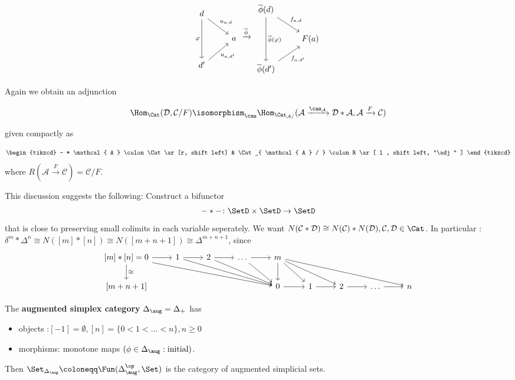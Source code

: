 \[
\begin{tikzcd}
	d
	\ar[rd, "u_{ a ,d } "]
	\ar[dd, "\varphi"']
	\\
	&
	a
	\\
	d'
	\ar[ru, "u_{ a , d' }"' ]
\end{tikzcd}
\xrightarrow{\overline{\phi}}
\begin{tikzcd}
	\overline{\phi} ( d )
	\ar[rd, "f_{ a ,d } "]
	\ar[dd, "\overline{ \phi } ( \varphi )"]
	\\
	&
	F ( a )
	\\
	\overline{\phi} ( d' )
	\ar[ru, "f_{ a , d' }"' ]
\end{tikzcd}
\] 

Again we obtain an adjunction

\[
	\Hom_{ \Cat } ( \mathcal{ D } , \mathcal{ C } / F )
	\isomorphism_{ \can }
	\Hom_{ \Cat_{ \mathcal{ A } / } } ( \mathcal{ A } \xrightarrow{ \can_{ \mathcal{ A } } } \mathcal{ D } * \mathcal{ A } , \mathcal{ A } \xrightarrow{ F } \mathcal{ C } )
\]

given compactly as 

\[
\begin{tikzcd}
	- * \mathcal{ A } \colon \Cat
	\ar[r, shift left]
	&
	\Cat_{ \mathcal{ A } / } \colon R 
	\ar[ l , shift left, "\adj" ]
\end{tikzcd}
\]
where $ R ( \mathcal{ A } \xrightarrow{ F } \mathcal{ C } ) = \mathcal{ C } / F $. 

This discussion suggests the following:
Construct a bifunctor 
\[
	- * - \colon \SetD \times \SetD \to \SetD	
\]
that is close to preserving small colimits in each variable seperately.
We want $ N ( \mathcal{ C } * \mathcal{ D } ) \cong N ( \mathcal{ C } ) * N ( \mathcal{ D } ), \mathcal{ C } , \mathcal{ D } \in \Cat $.
In particular : $ \delta^m * \Delta^n \cong N ( [ m ] * [ n ] ) \cong N ( [ m + n + 1 ] ) \cong \Delta^{ m + n + 1 } $, since
\[
\begin{tikzcd}
	\left[ m \right] * [ n ] = 0
	\ar[d, " \cong"]
	\ar[r]
	\ar[rrrrd]
	&
	1
	\ar[r]
	\ar[rrrd]
	&
	2
	\ar[r]
	\ar[rrd]
	&
	\dotsc
	\ar[r]
	\ar[rd]
	&
	m
	\ar[d]
	\ar[rd]
	\ar[rrd]
	\ar[rrrrd]
	\\
	\left[ m + n + 1 \right]
	&&&&
	0
	\ar[r]
	&
	1
	\ar[r]
	&
	2
	\ar[r]
	&
	\dotsc 
	\ar[r]
	&
	n
\end{tikzcd}
\]

\begin{defi}
	The \textbf{augmented simplex category} $ \Delta_{ \aug } = \Delta_+ $ has 
	\begin{itemize}
		\item 
		objects :$ [ - 1 ] = \emptyset , [ n ] = \{ 0 < 1 < \dotsc < n \}, n \geq 0 $
		
		\item 
		morphisms: monotone maps $ ( \phi \in \Delta_{ \aug } : \text{initial} ) $.
		
	\end{itemize}
	Then $ \Set_{ \Delta_ { \aug } } \coloneqq \Fun ( \Delta^{ \op }_{ \aug } , \Set ) $ is the category of augmented simplicial sets.
\end{defi}

